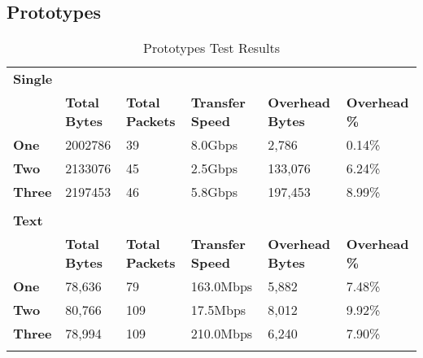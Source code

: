 \subsection*{Prototypes}
\begin{table}[h!]
	\caption{Prototypes Test Results}
	\label{tab:prototypes-test-results}
	\centering
	\begin{tabular}{l l l l l l}
		\textbf{Single}     &                      &                        &                         &                         &                      \\
		\textbf{}           & \textbf{Total Bytes} & \textbf{Total Packets} & \textbf{Transfer Speed} & \textbf{Overhead Bytes} & \textbf{Overhead \%} \\
		\hline
		\textbf{One}        & 2002786              & 39                     & 8.0Gbps                 & 2,786                   & 0.14\%               \\
		\hline
		\textbf{Two}        & 2133076              & 45                     & 2.5Gbps                 & 133,076                 & 6.24\%               \\
		\hline
		\textbf{Three}      & 2197453              & 46                     & 5.8Gbps                 & 197,453                 & 8.99\%               \\
		\hline
		                    &                      &                        &                         &                         &                      \\
		\textbf{Text}       &                      &                        &                         &                         &                      \\
		\textbf{}           & \textbf{Total Bytes} & \textbf{Total Packets} & \textbf{Transfer Speed} & \textbf{Overhead Bytes} & \textbf{Overhead \%} \\
		\hline
		\textbf{One}        & 78,636               & 79                     & 163.0Mbps               & 5,882                   & 7.48\%               \\
		\hline
		\textbf{Two}        & 80,766               & 109                    & 17.5Mbps                & 8,012                   & 9.92\%               \\
		\hline
		\textbf{Three}      & 78,994               & 109                    & 210.0Mbps               & 6,240                   & 7.90\%               \\
		\hline
		                    &                      &                        &                         &                         &                      \\

\end{tabular}
\end{table}
